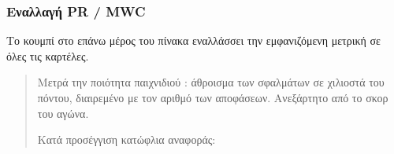 \documentclass[letterpaper,10pt,greek]{sphinxmanual}
\begin{document}
\subsubsection{Εναλλαγή PR / MWC}
\label{\detokenize{manuel:toggle-pr-mwc}}
\sphinxAtStartPar
Το κουμπί  στο επάνω μέρος του πίνακα εναλλάσσει την εμφανιζόμενη μετρική σε όλες τις καρτέλες.

\sphinxAtStartPar
{}
\begin{quote}

\sphinxAtStartPar
Μετρά την ποιότητα παιχνιδιού : άθροισμα των σφαλμάτων σε χιλιοστά του πόντου, διαιρεμένο με τον αριθμό των αποφάσεων. Ανεξάρτητο από το σκορ του αγώνα.

\sphinxAtStartPar
Κατά προσέγγιση κατώφλια αναφοράς:



\end{quote}
\end{document}

